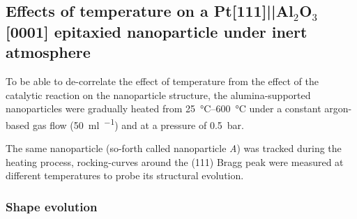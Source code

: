 \begin{table}[!htb]
\centering
{}
\caption{Example of algorithm chain used in BCDI for the phase retrieval.}
\label{tab:ReconstructionProcess}
\end{table}

\subsection{Effects of temperature on a Pt[111]||Al$_2$O$_3$[0001] epitaxied nanoparticle under inert atmosphere}\label{sec:TempRampBCDI}

To be able to de-correlate the effect of temperature from the effect of the catalytic reaction on the nanoparticle structure, the alumina-supported nanoparticles were gradually heated from \qtyrange{25}{600}{\degreeCelsius} under a constant argon-based gas flow (\qty{50}{\ml\per\min}) and at a pressure of \qty{0.5}{\bar}.

The same nanoparticle (so-forth called nanoparticle \textit{A}) was tracked during the heating process, rocking-curves around the (111) Bragg peak were measured at different temperatures to probe its structural evolution.

\subsubsection{Shape evolution}

